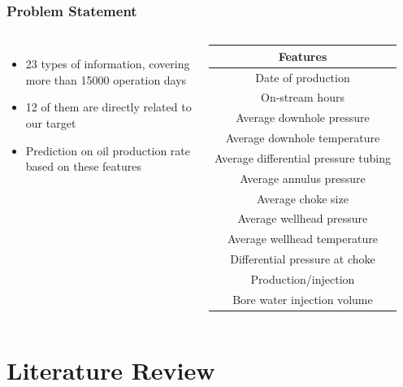 \documentclass[xcolor=table]{beamer}
\begin{document}
\begin{frame}
\frametitle{Problem Statement}
\begin{columns}[]
\begin{itemize}
\item 23 types of information, covering more than 15000 operation days
\item 12 of them are directly related to our target
\item Prediction on oil production rate based on these features
\end{itemize}
\begin{table}
\begin{tabular}{c}
\toprule
\textbf{Features}\\
\midrule
Date of production\tabularnewline
On-stream hours\tabularnewline
Average downhole pressure\tabularnewline
Average downhole temperature\tabularnewline
Average differential pressure tubing\tabularnewline
Average annulus pressure\tabularnewline
Average choke size\tabularnewline
Average wellhead pressure\tabularnewline
Average wellhead temperature\tabularnewline
Differential pressure at choke\tabularnewline
Production/injection\tabularnewline
Bore water injection volume\tabularnewline
\bottomrule
\end{tabular}
\end{table}

\end{columns}
\end{frame}

\section{Literature Review}
\end{document}

